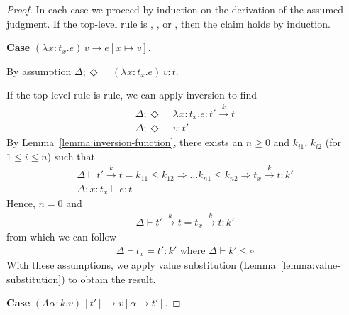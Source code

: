 \documentclass{article}
\newcommand{\ONE}{\circ}
\newcommand{\TASS}[1]{#1\colon\!}
\newcommand{\TVAR}{\alpha}
\newcommand{\LAM}[3][{}]{\lambda^{#1}\TASS{#2}#3.}
\newcommand{\APP}[1]{#1\,}
\newcommand{\TLAM}[3][{}]{\Lambda^{#1}\TASS{#2}#3.}
\newcommand{\TAPP}[2]{#1\,[#2]}
\newcommand{\KENV}{\Delta}
\newcommand{\TENVEMPTY}{\Diamond}
\newcommand\stepsto{\longrightarrow}
\begin{document}
\begin{proof}
  In each case we proceed by induction on the derivation of the
  assumed judgment.  If the top-level rule is ,
  , or , then the claim holds by
  induction.

  \textbf{Case} ${\APP{(\LAM x {t_x} e)}v \stepsto e[x \mapsto v]}$.

  By assumption $\KENV;\TENVEMPTY \vdash \APP{(\LAM x {t_x} e)}v : t$.


  If the top-level rule is  rule, we can apply inversion to find
  \begin{gather}
    \label{eq:1}
    \KENV; \TENVEMPTY \vdash \LAM x {t_x} e : t' \stackrel{k}\to t
    \\
    \label{eq:2}
    \KENV; \TENVEMPTY \vdash v : t'
  \end{gather}
  By Lemma~\ref{lemma:inversion-function}, there exists an $n\ge0$ and $k_{i1}$, $k_{i2}$ (for $1\le i\le n$) such that
  \begin{gather}
    \KENV \vdash t' \stackrel{k}\to t = k_{11}\le k_{12}\Rightarrow \dots k_{n1}\le k_{n2} \Rightarrow t_x \stackrel{k}\to t : k'
    \\
    \KENV; \TASS x{t_x} \vdash e : t
  \end{gather}
  Hence, $n=0$ and 
  \begin{gather}
    \KENV \vdash t' \stackrel{k}\to t = t_x \stackrel{k}\to t : k'
  \end{gather}
  from which we can follow
  \begin{gather}
    \label{eq:3}
    \KENV \vdash t_x = t' : k' \text{ where } \KENV \vdash k' \le \ONE
  \end{gather}
  With these assumptions, we apply value substitution
  (Lemma~\ref{lemma:value-substitution}) to obtain the result.

  \textbf{Case} $\TAPP{(\TLAM \TVAR k v)}{t'} \stepsto v[\TVAR \mapsto t']$.


\end{proof}
\end{document}
